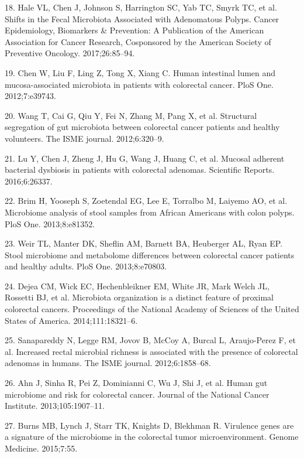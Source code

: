 \documentclass[12pt,]{article}
\begin{document}
\hypertarget{ref-hale_shifts_2017}{}
18. Hale VL, Chen J, Johnson S, Harrington SC, Yab TC, Smyrk TC, et al.
Shifts in the Fecal Microbiota Associated with Adenomatous Polyps.
Cancer Epidemiology, Biomarkers \& Prevention: A Publication of the
American Association for Cancer Research, Cosponsored by the American
Society of Preventive Oncology. 2017;26:85--94.

\hypertarget{ref-chen_human_2012}{}
19. Chen W, Liu F, Ling Z, Tong X, Xiang C. Human intestinal lumen and
mucosa-associated microbiota in patients with colorectal cancer. PloS
One. 2012;7:e39743.

\hypertarget{ref-wang_structural_2012}{}
20. Wang T, Cai G, Qiu Y, Fei N, Zhang M, Pang X, et al. Structural
segregation of gut microbiota between colorectal cancer patients and
healthy volunteers. The ISME journal. 2012;6:320--9.

\hypertarget{ref-lu_mucosal_2016}{}
21. Lu Y, Chen J, Zheng J, Hu G, Wang J, Huang C, et al. Mucosal
adherent bacterial dysbiosis in patients with colorectal adenomas.
Scientific Reports. 2016;6:26337.

\hypertarget{ref-brim_microbiome_2013}{}
22. Brim H, Yooseph S, Zoetendal EG, Lee E, Torralbo M, Laiyemo AO, et
al. Microbiome analysis of stool samples from African Americans with
colon polyps. PloS One. 2013;8:e81352.

\hypertarget{ref-weir_stool_2013}{}
23. Weir TL, Manter DK, Sheflin AM, Barnett BA, Heuberger AL, Ryan EP.
Stool microbiome and metabolome differences between colorectal cancer
patients and healthy adults. PloS One. 2013;8:e70803.

\hypertarget{ref-dejea_microbiota_2014}{}
24. Dejea CM, Wick EC, Hechenbleikner EM, White JR, Mark Welch JL,
Rossetti BJ, et al. Microbiota organization is a distinct feature of
proximal colorectal cancers. Proceedings of the National Academy of
Sciences of the United States of America. 2014;111:18321--6.

\hypertarget{ref-sanapareddy_increased_2012}{}
25. Sanapareddy N, Legge RM, Jovov B, McCoy A, Burcal L, Araujo-Perez F,
et al. Increased rectal microbial richness is associated with the
presence of colorectal adenomas in humans. The ISME journal.
2012;6:1858--68.

\hypertarget{ref-ahn_human_2013}{}
26. Ahn J, Sinha R, Pei Z, Dominianni C, Wu J, Shi J, et al. Human gut
microbiome and risk for colorectal cancer. Journal of the National
Cancer Institute. 2013;105:1907--11.

\hypertarget{ref-burns_virulence_2015}{}
27. Burns MB, Lynch J, Starr TK, Knights D, Blekhman R. Virulence genes
are a signature of the microbiome in the colorectal tumor
microenvironment. Genome Medicine. 2015;7:55.
\end{document}

